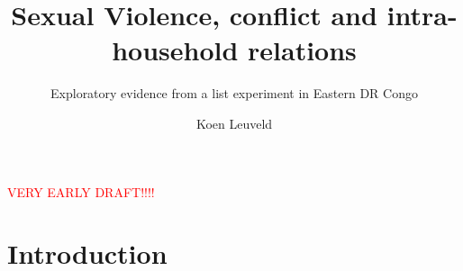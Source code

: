 \documentclass[11pt,a4paper]{scrartcl} %
\begin{document}
\author{Koen Leuveld}




\title{Sexual Violence, conflict and intra-household relations}
\subtitle{Exploratory evidence from a list experiment in Eastern DR Congo} %

\maketitle

\begin{center}
\textcolor{red}{\Large VERY EARLY DRAFT!!!!}
\end{center}







\section*{Introduction}
\end{document}
